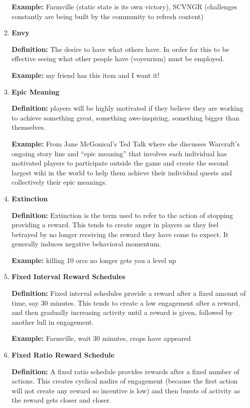 \begin{enumerate}
\textbf{Example:} Farmville (static state is its own victory), SCVNGR (challenges constantly are being built by the community to refresh content)

\item \textbf{Envy}

\textbf{Definition:} The desire to have what others have. In order for this to be effective seeing what other people have (voyeurism) must be employed.

\textbf{Example:} my friend has this item and I want it!

\item \textbf{Epic Meaning}

\textbf{Definition:} players will be highly motivated if they believe they are working to achieve something great, something awe-inspiring, something bigger than themselves.

\textbf{Example:} From Jane McGonical’s Ted Talk where she discusses Warcraft’s ongoing story line and “epic meaning” that involves each individual has motivated players to participate outside the game and create the second largest wiki in the world to help them achieve their individual quests and collectively their epic meanings.

\item \textbf{Extinction}

\textbf{Definition:} Extinction is the term used to refer to the action of stopping providing a reward. This tends to create anger in players as they feel betrayed by no longer receiving the reward they have come to expect. It generally induces negative behavioral momentum.

\textbf{Example:} killing 10 orcs no longer gets you a level up

\item \textbf{Fixed Interval Reward Schedules}

\textbf{Definition:} Fixed interval schedules provide a reward after a fixed amount of time, say 30 minutes. This tends to create a low engagement after a reward, and then gradually increasing activity until a reward is given, followed by another lull in engagement.

\textbf{Example:} Farmville, wait 30 minutes, crops have appeared

\item \textbf{Fixed Ratio Reward Schedule}

\textbf{Definition:} A fixed ratio schedule provides rewards after a fixed number of actions. This creates cyclical nadirs of engagement (because the first action will not create any reward so incentive is low) and then bursts of activity as the reward gets closer and closer.


\end{enumerate}
